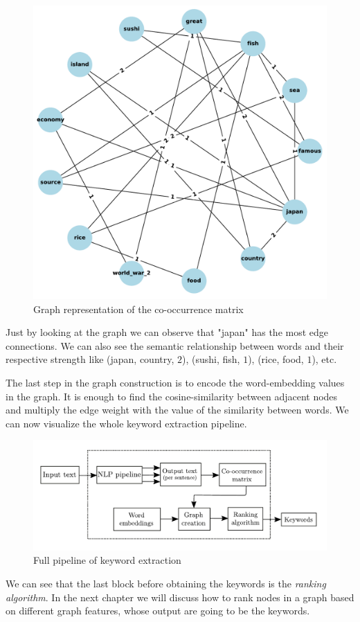 \documentclass[12pt]{article}
\numberwithin{equation}{section}
\begin{document}
\begin{spacing}{1.5}
	\begin{figure}[H]
		\centering
		\includegraphics[scale=0.80]{graph_example}		
		\caption{Graph representation of the co-occurrence matrix}
		\label{graph_example}
	\end{figure}

	Just by looking at the graph we can observe that "japan" has the most edge connections. We can also see the semantic relationship between words and their respective strength like (japan, country, $2$), (sushi, fish, $1$), (rice, food, $1$), etc.
	
	The last step in the graph construction is to encode the word-embedding values in the graph. It is enough to find the cosine-similarity between adjacent nodes and multiply the edge weight with the value of the similarity between words.
	We can now visualize the whole keyword extraction pipeline.
	
	\begin{figure}[H]
		\centering
		\hspace*{-1cm}
		\includegraphics[scale=1.0]{full_pipeline}		
		\caption{Full pipeline of keyword extraction}
		\label{full_pipeline}
	\end{figure}
	We can see that the last block before obtaining the keywords is the \textit{ranking algorithm}. In the next chapter we will discuss how to rank nodes in a graph based on different graph features, whose output are going to be the keywords.
	

\end{spacing}
\end{document}
